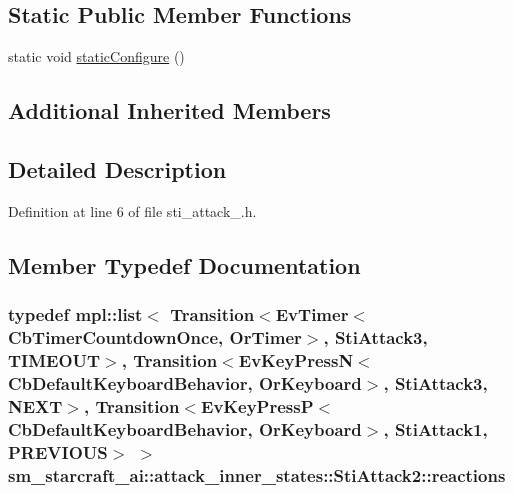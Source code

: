 \subsection*{Static Public Member Functions}
\begin{DoxyCompactItemize}
\item 
static void \hyperlink{structsm__starcraft__ai_1_1attack__inner__states_1_1StiAttack2_ab86bb635738bb7d4d85d663203c8c2d9}{static\+Configure} ()
\end{DoxyCompactItemize}
\subsection*{Additional Inherited Members}


\subsection{Detailed Description}


Definition at line 6 of file sti\+\_\+attack\+\_.\+h.



\subsection{Member Typedef Documentation}
\subsubsection[{\texorpdfstring{reactions}{reactions}}]{\setlength{\rightskip}{0pt plus 5cm}typedef mpl\+::list$<$ Transition$<$Ev\+Timer$<$Cb\+Timer\+Countdown\+Once, {\bf Or\+Timer}$>$, {\bf Sti\+Attack3}, {\bf T\+I\+M\+E\+O\+UT}$>$, Transition$<$Ev\+Key\+PressN$<$Cb\+Default\+Keyboard\+Behavior, {\bf Or\+Keyboard}$>$, {\bf Sti\+Attack3}, {\bf N\+E\+XT}$>$, Transition$<$Ev\+Key\+PressP$<$Cb\+Default\+Keyboard\+Behavior, {\bf Or\+Keyboard}$>$, {\bf Sti\+Attack1}, {\bf P\+R\+E\+V\+I\+O\+US}$>$ $>$ {\bf sm\+\_\+starcraft\+\_\+ai\+::attack\+\_\+inner\+\_\+states\+::\+Sti\+Attack2\+::reactions}}\hypertarget{structsm__starcraft__ai_1_1attack__inner__states_1_1StiAttack2_a978f087e297634bc2e93830ee485a799}{}\label{structsm__starcraft__ai_1_1attack__inner__states_1_1StiAttack2_a978f087e297634bc2e93830ee485a799}


